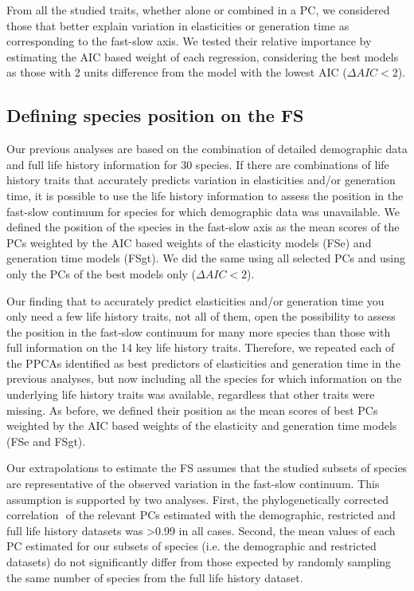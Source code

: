 From all the studied traits, whether alone or combined in a PC, we 
considered those that better explain variation in elasticities or generation 
time as corresponding to the fast-slow axis. We tested their relative 
importance by estimating the AIC based weight of each regression, considering 
the best models as those with 2 units difference from the model with the lowest 
AIC ($\Delta AIC < 2$).


\subsection*{Defining species position on the FS}

Our previous analyses are based on the combination of detailed demographic data 
and full life history information for 30 species. If there are combinations of 
life history traits that accurately predicts variation in elasticities and/or 
generation time, it is possible to use the life history information to assess 
the position in the fast-slow continuum for species for which demographic data 
was unavailable. We defined the position of the species in the fast-slow axis 
as the mean scores of the PCs weighted by the AIC based weights 
of the elasticity models (FSe) and generation time models (FSgt). We did the 
same using all selected PCs and using only the PCs of the best models only 
($\Delta AIC < 2$).

Our finding that to accurately predict elasticities and/or generation time you 
only need a few life history traits, not all of them, open the possibility to 
assess the position in the fast-slow continuum for many more species than those 
with full information on the 14 key life history traits. Therefore, we repeated 
each of the PPCAs identified as best predictors of elasticities and generation 
time in the previous analyses, but now including all the species for which 
information on the underlying life history traits was available, regardless that 
other traits were missing. As before, we defined their position as the mean 
scores of best PCs weighted by the AIC based weights of the elasticity 
and generation time models (FSe and FSgt).

Our extrapolations to estimate the FS assumes that the studied subsets of 
species are representative of the observed variation in the fast-slow continuum. 
This assumption is supported by two analyses. First, the phylogenetically 
corrected correlation \citep{Revell2009a}⁠ of the relevant PCs estimated with
the demographic, restricted and full life history datasets was
\textgreater{0.99} in all cases.
Second, the mean values of each PC estimated for our subsets of species (i.e.
the demographic and restricted datasets) do not significantly differ from those
expected by randomly sampling the same number of species from the full life
history dataset.


